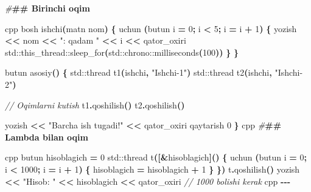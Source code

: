 \documentclass[a4paper,11pt,twoside,openright]{book}
\newenvironment{Shaded}{\begin{snugshade}}{\end{snugshade}}
\newcommand{\BuiltInTok}[1]{#1}
\newcommand{\CommentTok}[1]{\textcolor[rgb]{0.56,0.35,0.01}{\textit{#1}}}
\newcommand{\DecValTok}[1]{\textcolor[rgb]{0.00,0.00,0.81}{#1}}
\newcommand{\ErrorTok}[1]{\textcolor[rgb]{0.64,0.00,0.00}{\textbf{#1}}}
\newcommand{\NormalTok}[1]{#1}
\newcommand{\OperatorTok}[1]{\textcolor[rgb]{0.81,0.36,0.00}{\textbf{#1}}}
\newcommand{\PreprocessorTok}[1]{\textcolor[rgb]{0.56,0.35,0.01}{\textit{#1}}}
\newcommand{\StringTok}[1]{\textcolor[rgb]{0.31,0.60,0.02}{#1}}
\begin{document}
\begin{Shaded}
\begin{Highlighting}[]
\PreprocessorTok{\#}\ErrorTok{\#\# Birinchi oqim}

\ErrorTok{\textasciigrave{}\textasciigrave{}\textasciigrave{}}\NormalTok{cpp}
\NormalTok{bosh ishchi}\OperatorTok{(}\NormalTok{matn nom}\OperatorTok{)} \OperatorTok{\{}
\NormalTok{    uchun }\OperatorTok{(}\NormalTok{butun i }\OperatorTok{=} \DecValTok{0}\OperatorTok{;}\NormalTok{ i }\OperatorTok{\textless{}} \DecValTok{5}\OperatorTok{;}\NormalTok{ i }\OperatorTok{=}\NormalTok{ i }\OperatorTok{+} \DecValTok{1}\OperatorTok{)} \OperatorTok{\{}
\NormalTok{        yozish }\OperatorTok{\textless{}\textless{}}\NormalTok{ nom }\OperatorTok{\textless{}\textless{}} \StringTok{": qadam "} \OperatorTok{\textless{}\textless{}}\NormalTok{ i }\OperatorTok{\textless{}\textless{}}\NormalTok{ qator\_oxiri}
        \BuiltInTok{std::}\NormalTok{this\_thread::sleep\_for}\OperatorTok{(}\BuiltInTok{std::}\NormalTok{chrono::milliseconds}\OperatorTok{(}\DecValTok{100}\OperatorTok{))}
    \OperatorTok{\}}
\OperatorTok{\}}

\NormalTok{butun asosiy}\OperatorTok{()} \OperatorTok{\{}
    \BuiltInTok{std::}\NormalTok{thread t1}\OperatorTok{(}\NormalTok{ishchi}\OperatorTok{,} \StringTok{"Ishchi{-}1"}\OperatorTok{)}
    \BuiltInTok{std::}\NormalTok{thread t2}\OperatorTok{(}\NormalTok{ishchi}\OperatorTok{,} \StringTok{"Ishchi{-}2"}\OperatorTok{)}

    \CommentTok{// Oqimlarni kutish}
\NormalTok{    t1}\OperatorTok{.}\NormalTok{qoshilish}\OperatorTok{()}
\NormalTok{    t2}\OperatorTok{.}\NormalTok{qoshilish}\OperatorTok{()}

\NormalTok{    yozish }\OperatorTok{\textless{}\textless{}} \StringTok{"Barcha ish tugadi!"} \OperatorTok{\textless{}\textless{}}\NormalTok{ qator\_oxiri}
\NormalTok{    qaytarish }\DecValTok{0}
\OperatorTok{\}}
\ErrorTok{\textasciigrave{}\textasciigrave{}\textasciigrave{}}\NormalTok{cpp}
\PreprocessorTok{\#}\ErrorTok{\#\# Lambda bilan oqim}

\ErrorTok{\textasciigrave{}\textasciigrave{}\textasciigrave{}}\NormalTok{cpp}
\NormalTok{butun hisoblagich }\OperatorTok{=} \DecValTok{0}
\BuiltInTok{std::}\NormalTok{thread t}\OperatorTok{([\&}\NormalTok{hisoblagich}\OperatorTok{]()} \OperatorTok{\{}
\NormalTok{    uchun }\OperatorTok{(}\NormalTok{butun i }\OperatorTok{=} \DecValTok{0}\OperatorTok{;}\NormalTok{ i }\OperatorTok{\textless{}} \DecValTok{1000}\OperatorTok{;}\NormalTok{ i }\OperatorTok{=}\NormalTok{ i }\OperatorTok{+} \DecValTok{1}\OperatorTok{)} \OperatorTok{\{}
\NormalTok{        hisoblagich }\OperatorTok{=}\NormalTok{ hisoblagich }\OperatorTok{+} \DecValTok{1}
    \OperatorTok{\}}
\OperatorTok{\})}
\NormalTok{t}\OperatorTok{.}\NormalTok{qoshilish}\OperatorTok{()}
\NormalTok{yozish }\OperatorTok{\textless{}\textless{}} \StringTok{"Hisob: "} \OperatorTok{\textless{}\textless{}}\NormalTok{ hisoblagich }\OperatorTok{\textless{}\textless{}}\NormalTok{ qator\_oxiri   }\CommentTok{// 1000 bo\textquotesingle{}lishi kerak}
\ErrorTok{\textasciigrave{}\textasciigrave{}\textasciigrave{}}\NormalTok{cpp}
\OperatorTok{{-}{-}{-}}


\end{Highlighting}
\end{Shaded}
\end{document}
